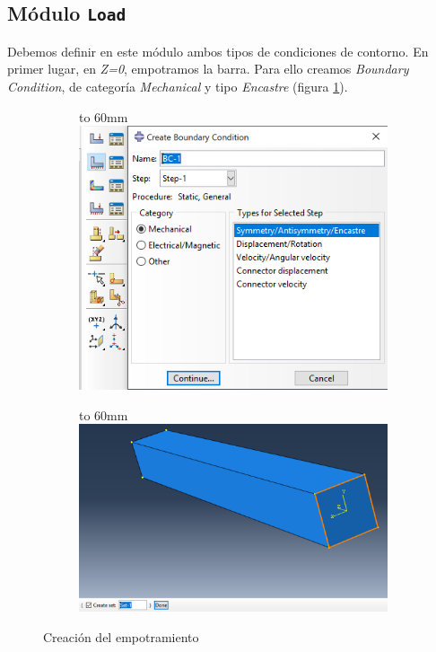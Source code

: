 \documentclass[spanish,a4paper,12pt]{article}
\def\imagebox#1#2{\vtop to #1{\null\hbox{#2}\vfill}}
\begin{document}
\clearpage
\subsection{Módulo \texttt{Load}}
Debemos definir en este módulo ambos tipos de condiciones de contorno. En primer lugar, en \emph{Z=0}, empotramos la barra. Para ello creamos \emph{Boundary Condition}, de categoría \emph{Mechanical} y tipo \emph{Encastre} (figura \ref{fig:load1}).

\begin{figure}[h!tp]
\centering
\captionsetup[subfigure]{justification=centering,singlelinecheck=false}
  \begin{subfigure}[b]{0.4\textwidth}
  \hspace{0mm}
    \imagebox{60mm}{\includegraphics[scale=0.4]{capturas/load1.png}}
  \end{subfigure}
  \begin{subfigure}[b]{0.59\textwidth}
  \hspace{1mm}
    \imagebox{60mm}{\includegraphics[scale=0.35]{capturas/load2.png}}
  \end{subfigure}
\caption{Creación del empotramiento}
\label{fig:load1}
\end{figure}
\end{document}
